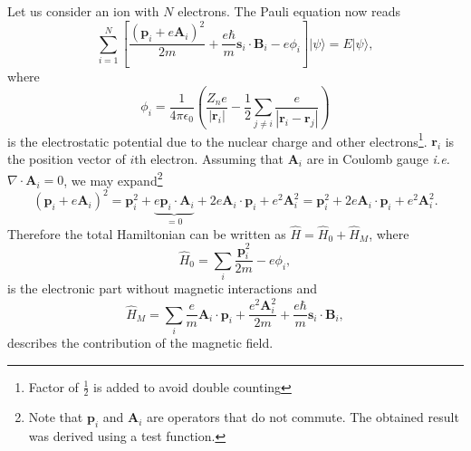 Let us consider an ion with $N$ electrons. The Pauli equation now reads
\begin{equation}
\sum_{i=1}^N \left[\frac{(\mathbf{p}_i + e \mathbf{A}_i)^2}{2m} + \frac{e \hbar}{m} \mathbf{s}_i \cdot \mathbf{B}_i - e \phi_i \right] | \psi \rangle = E | \psi \rangle,
\end{equation}
where
\begin{equation}
\phi_i =\frac{1}{4\pi \epsilon_0} \left(\frac{Z_n e}{ |\mathbf{r}_i|} - \frac{1}{2} \sum_{j \neq i} \frac{e}{|\mathbf{r}_i - \mathbf{r}_j|} \right)
\end{equation}
is the electrostatic potential due to the nuclear charge and other electrons\footnote{Factor of $\frac{1}{2}$ is added to avoid double counting}.
$\mathbf{r}_i$ is the position vector of $i$th electron. Assuming that $\mathbf{A}_i$ are in Coulomb gauge \emph{i.e.} $\nabla \cdot \mathbf{A}_i = 0$, we may expand\footnote{Note that $\mathbf{p}_i$ and $\mathbf{A}_i$ are operators that do not commute. The obtained result was derived using a test function.}
\begin{equation}
(\mathbf{p}_i + e \mathbf{A}_i)^2 = \mathbf{p}_i^2 
+ \underbrace{e \mathbf{p}_i \cdot\mathbf{A}_i}_{=0}
+ 2 e \mathbf{A}_i \cdot \mathbf{p}_i
+ e^2 \mathbf{A}_i^2 = \mathbf{p}_i^2 
+ 2 e \mathbf{A}_i \cdot \mathbf{p}_i
+ e^2 \mathbf{A}_i^2.
\end{equation}
Therefore the total Hamiltonian can be written as $\hat{H} = \hat{H}_0 + \hat{H}_M$, where 
\begin{equation}
\hat{H}_0 = \sum_i \frac{\mathbf{p}_i^2}{2 m} - e \phi_i,
\end{equation}
is the electronic part without magnetic interactions and 
\begin{equation}\label{eq:H_magnetic}
\hat{H}_M = \sum_i \frac{e}{m}\mathbf{A}_i\cdot\mathbf{p}_i + \frac{e^2 \mathbf{A}_i^2}{2 m} + \frac{e \hbar}{m} \mathbf{s}_i \cdot \mathbf{B}_i,
\end{equation}
describes the contribution of the magnetic field.

